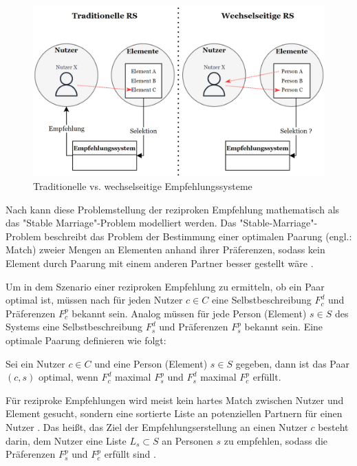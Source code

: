 \begin{figure}[H]
    \centering
	\includegraphics[width=1.0\textwidth]{gfx/traditional-vs-rrs.png}
	\caption[Traditionelle vs. wechselseitige Empfehlungssysteme]{Traditionelle vs. wechselseitige Empfehlungssysteme\\}
	\label{fig:empfehlungssysteme:rrs:abb1}
\end{figure}

Nach \textcite[S. 36]{li:inproceedings} kann diese Problemstellung der reziproken Empfehlung mathematisch als das "Stable Marriage"-Problem modelliert werden.
Das "Stable-Marriage"-Problem beschreibt das Problem der Bestimmung einer optimalen Paarung (engl.: Match) zweier Mengen an Elementen anhand ihrer Präferenzen, sodass kein Element durch Paarung mit einem anderen Partner besser gestellt wäre \cite[S. 36]{li:inproceedings}\cite[S. 67]{diaz:inproceedings}.

Um in dem Szenario einer reziproken Empfehlung zu ermitteln, ob ein Paar optimal ist, müssen nach \textcite[S. 36]{li:inproceedings} für jeden Nutzer $c \in C$ eine Selbstbeschreibung $F_{c}^{d}$ und Präferenzen $F_{c}^{p}$ bekannt sein.
Analog müssen für jede Person (Element) $s \in S$ des Systems eine Selbstbeschreibung $F_{s}^{d}$ und Präferenzen $F_{s}^{p}$ bekannt sein.
Eine optimale Paarung definieren \textcite[S. 36]{li:inproceedings} wie folgt: 

\begin{definition}\label{def:1}
    Sei ein Nutzer $c \in C$ und eine Person (Element) $s \in S$ gegeben, dann ist das Paar $(c,s)$ optimal, wenn $F_{c}^{d}$ maximal $F_{s}^{p}$ und $F_{s}^{d}$ maximal $F_{c}^{p}$ erfüllt.
\end{definition}

Für reziproke Empfehlungen wird meist kein hartes Match zwischen Nutzer und Element gesucht, sondern eine sortierte Liste an potenziellen Partnern für einen Nutzer \cite[S. 67]{diaz:inproceedings}.
Das heißt, das Ziel der Empfehlungserstellung an einen Nutzer $c$ besteht darin, dem Nutzer eine Liste $L_{s} \subset S$ an Personen $s$ zu empfehlen, sodass die Präferenzen $F_{s}^{p}$ und $F_{c}^{p}$ erfüllt sind \cite[S. 36]{li:inproceedings}.

